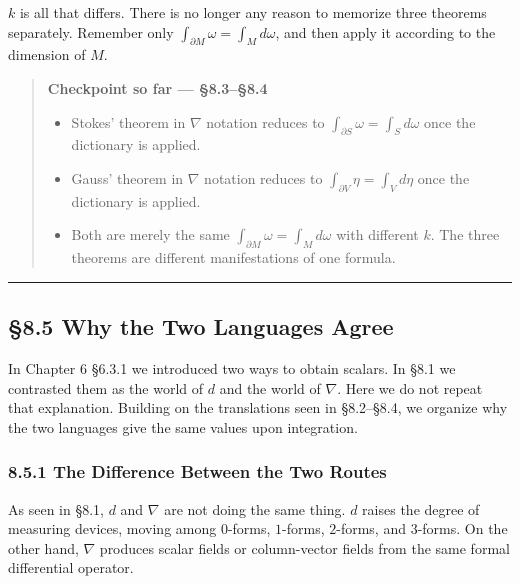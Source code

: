 \(k\) is all that differs. There is no longer any reason to memorize
three theorems separately. Remember only
\(\int_{\partial M}\omega = \int_M d\omega\), and then apply it
according to the dimension of \(M\).

\begin{quote}
\textbf{Checkpoint so far — §8.3–§8.4}

\begin{itemize}
\item
  Stokes' theorem in \(\nabla\) notation reduces to
  \(\int_{\partial S}\omega = \int_S d\omega\) once the dictionary is
  applied.
\item
  Gauss' theorem in \(\nabla\) notation reduces to
  \(\int_{\partial V}\eta = \int_V d\eta\) once the dictionary is
  applied.
\item
  Both are merely the same \(\int_{\partial M}\omega = \int_M d\omega\)
  with different \(k\). The three theorems are different manifestations
  of one formula.
\end{itemize}
\end{quote}

\begin{center}\rule{0.5\linewidth}{0.5pt}\end{center}

\hypertarget{why-the-two-languages-agree}{%
\subsection{§8.5 Why the Two Languages
Agree}\label{why-the-two-languages-agree}}

In Chapter 6 §6.3.1 we introduced two ways to obtain scalars. In §8.1 we
contrasted them as the world of \(d\) and the world of \(\nabla\). Here
we do not repeat that explanation. Building on the translations seen in
§8.2--§8.4, we organize why the two languages give the same values upon
integration.

\hypertarget{the-difference-between-the-two-routes}{%
\subsubsection{8.5.1 The Difference Between the Two
Routes}\label{the-difference-between-the-two-routes}}

As seen in §8.1, \(d\) and \(\nabla\) are not doing the same thing.
\(d\) raises the degree of measuring devices, moving among \(0\)-forms,
\(1\)-forms, \(2\)-forms, and \(3\)-forms. On the other hand, \(\nabla\)
produces scalar fields or column-vector fields from the same formal
differential operator.

